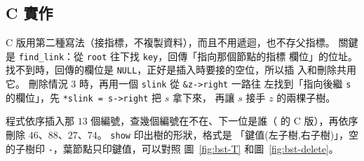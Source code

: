 \subsection{C 實作}

C 版用第二種寫法（接指標，不複製資料），而且不用遞迴，也不存父指標。 關鍵是
\texttt{find\_link}：從 \texttt{root} 往下找 \texttt{key}，回傳「指向那個節點的指標
欄位」的位址。 找不到時，回傳的欄位是 \texttt{NULL}，正好是插入時要接的空位，所以插
入和刪除共用它。 刪除情況 3 時，再用一個 \texttt{slink} 從 \texttt{\&z->right} 一路往
左找到「指向後繼 \texttt{s} 的欄位」，先 \texttt{*slink = s->right} 把 $s$ 拿下來，
再讓 $s$ 接手 $z$ 的兩棵子樹。

程式依序插入那 $13$ 個編號，查幾個編號在不在、下一位是誰（
的 C 版），再依序刪除 $46$、$88$、$27$、$74$。 \texttt{show} 印出樹的形狀，格式是
「鍵值(左子樹,右子樹)」，空的子樹印 \texttt{-}，葉節點只印鍵值，可以對照
圖~\ref{fig:bst-T} 和圖~\ref{fig:bst-delete}。

